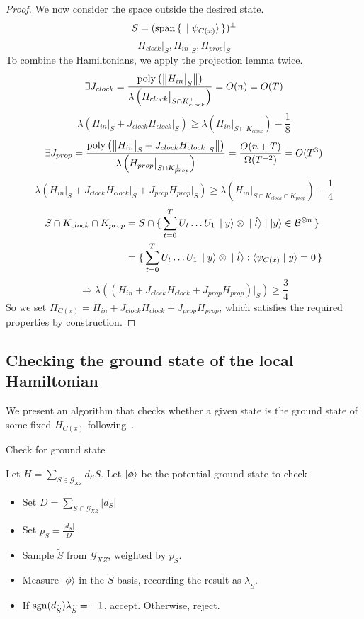 \begin{proof}
We now consider the space outside the desired state.
$$S=(\operatorname*{\operatorname{span}}\set{\ket{\psi_{C(x)}}})^\bot$$
$$H_{clock}\big|_S,H_{in}\big|_S,H_{prop}\big|_S$$
To combine the Hamiltonians, we apply the projection lemma twice.
$$\exists J_{clock}
=\frac{\operatorname*{\operatorname{poly}}\left(\left\lVert H_{in}\big|_S\right\rVert\right)}{\lambda\left(H_{clock}\big|_{S\cap K^\bot_{clock}}\right)}
=O(n)=O(T)$$
$$\lambda(H_{in}\big|_S+J_{clock}H_{clock}\big|_S)\geq
\lambda(H_{in}\big|_{S\cap K_{clock}})-\frac{1}{8}$$
$$\exists J_{prop}=\frac{\operatorname*{\operatorname{poly}}\left(\left\lVert H_{in}\big|_S+J_{clock}H_{clock}\big|_S\right\rVert\right)}{\lambda\left(H_{prop}\big|_{S\cap K^\bot_{prop}}\right)}
=\frac{O(n+T)}{\Omega(T^{-2})}=O(T^3)$$
$$\lambda(H_{in}\big|_S+J_{clock}H_{clock}\big|_S+J_{prop}H_{prop}\big|_S)\geq
\lambda(H_{in}\big|_{S\cap K_{clock}\cap K_{prop}})-\frac{1}{4}$$
\begin{align*}
	S\cap K_{clock}\cap K_{prop}&=S\cap\set{\sum_{t=0}^TU_t\ldots U_1\ket{y}\otimes\ket{\hat{t}}|\ket{y}\in\mathcal{B}^{\otimes n}}\\
	&=\set{\sum_{t=0}^TU_t\ldots U_1\ket{y}\otimes\ket{\hat{t}}:\braket{\psi_{C(x)}|y}=0}
\end{align*}
$$\Rightarrow\lambda((H_{in}+J_{clock}H_{clock}+J_{prop}H_{prop})\big|_S)\geq\frac{3}{4}$$
So we set $H_{C(x)}=H_{in}+J_{clock}H_{clock}+J_{prop}H_{prop}$, which satisfies the required properties by construction.
\end{proof}

\subsection{Checking the ground state of the local Hamiltonian}


We present an algorithm that checks whether a given state is the ground state of some fixed $H_{C(x)}$ following~\cite{PhysRevA.93.022326}.

\begin{algorithm}
	\caption{Check for ground state}
	\label{AlgGroundStateCheck}
		Let $H=\sum_{S\in\mathcal{G}_{XZ}} d_S S$.
		Let $\ket\phi$ be the potential ground state to check
		\begin{itemize}
			\item Set $D = \sum_{S\in\mathcal{G}_{XZ}}|d_S|$
			\item Set $p_S = \frac{|d_S|}{D}$
			\item Sample $\widetilde{S}$ from $\mathcal{G}_{XZ}$, weighted by $p_S$.
			\item Measure $\ket\phi$ in the $\widetilde{S}$ basis, recording the result as $\lambda_{\widetilde{S}}$.
			\item If $\operatorname{sgn}(d_{\widetilde{S}})\lambda_{\widetilde{S}}=-1$, accept. Otherwise, reject.
		\end{itemize}
\end{algorithm}

